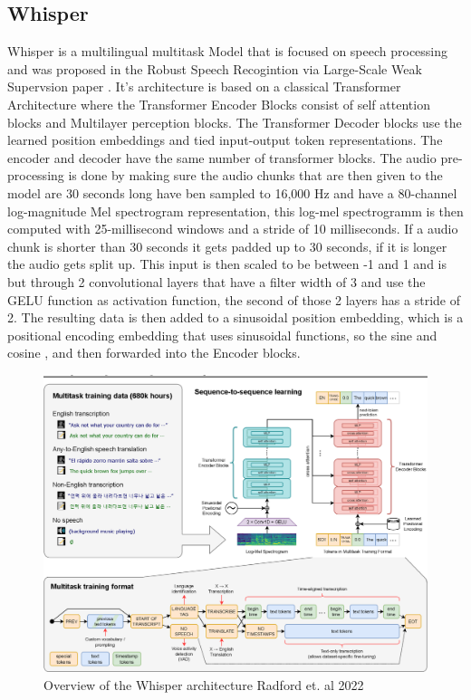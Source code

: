 \subsection{Whisper}
Whisper is a multilingual multitask Model that is focused on speech processing and was proposed in the Robust Speech Recogintion via Large-Scale Weak Supervsion paper \cite{radford2022robust}. 
It's architecture is based on a classical Transformer Architecture where the Transformer Encoder Blocks consist of self attention blocks and Multilayer perception blocks. 
The Transformer Decoder blocks use the learned position embeddings and tied input-output token representations. 
The encoder and decoder have the same number of transformer blocks.
The audio pre-processing is done by making sure the audio chunks that are then given to the model are 30 seconds long have ben sampled to 16,000 Hz and have a 80-channel log-magnitude Mel spectrogram representation, this log-mel spectrogramm is then computed with 25-millisecond windows and a stride of 10 milliseconds. If a audio chunk is shorter than 30 seconds it gets padded up to 30 seconds, if it is longer the audio gets split up. 
This input is then scaled to be between -1 and 1 and is but through 2 convolutional layers that have a filter width of 3 and use the GELU function as activation function, the second of those 2 layers has a stride of 2. 
The resulting data is then added to a sinusoidal position embedding, which is a positional encoding embedding that uses sinusoidal functions, so the sine and cosine \cite{vaswani2023attentionneed}, and then forwarded into the Encoder blocks.

\begin{figure}
        \centering%
        \includegraphics[width=0.5\linewidth]{Latex//sections//images/whispermodel.png}
        \caption{Overview of the Whisper architecture Radford et. al 2022}
        \label{fig:whispermodel}
    \end{figure}



